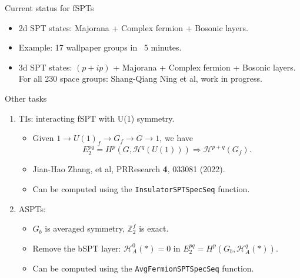 \documentclass[xcolor=table, aspectratio=169]{beamer}
\begin{document}
\begin{frame}{Current status for fSPTs}
	\begin{itemize}
		\item 2d SPT states: Majorana + Complex fermion + Bosonic layers.
		\item Example: 17 wallpaper groups in ~5 minutes.
		\item 3d SPT states: $(p+ip)$ + Majorana + Complex fermion + Bosonic layers.\\
		For all 230 space groups: Shang-Qiang Ning et al, work in progress.
	\end{itemize}
\end{frame}

\begin{frame}{Other tasks}
	\begin{enumerate}
		\item TIs: interacting fSPT with U(1) symmetry.
		\begin{itemize}
			\item Given $1\rightarrow U(1)_f\rightarrow G_f\rightarrow G\rightarrow 1$, we have
			\[E_2^{pq}=H^p(G, \mathcal H^q(U(1)))\Rightarrow \mathcal H^{p+q}(G_f).\]
			\item Jian-Hao Zhang, et al, PRResearch \textbf{4}, 033081 (2022).
			\item Can be computed using the \lstinline|InsulatorSPTSpecSeq| function.
		\end{itemize}

		\item ASPTs:
		\begin{itemize}
			\item $G_b$ is averaged symmetry, $\mathbb Z_2^f$ is exact.
			\item Remove the bSPT layer: $\mathcal H^0_A(*)=0$ in $E_2^{pq}=H^p(G_b, \mathcal H^q_A(*))$.
			\item Can be computed using the \lstinline|AvgFermionSPTSpecSeq| function.
		\end{itemize}
	\end{enumerate}
\end{frame}
\end{document}
